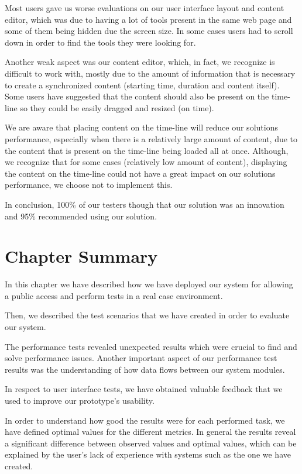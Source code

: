 Most users gave us worse evaluations on our user interface layout and content editor, which was due to having a lot of tools present in the same web page and some of them being hidden due the screen size. In some cases users had to scroll down in order to find the tools they were looking for. 

Another weak aspect was our content editor, which, in fact, we recognize is difficult to work with, mostly due to the amount of information that is necessary to create a synchronized content (starting time, duration and content itself). Some users have suggested that the content should also be present on the time-line so they could be easily dragged and resized (on time).

We are aware that placing content on the time-line will reduce our solutions performance, especially when there is a relatively large amount of content, due to the content that is present on the time-line being loaded all at once. Although, we recognize that for some cases (relatively low amount of content), displaying the content on the time-line could not have a great impact on our solutions performance, we choose not to implement this.

In conclusion, 100\% of our testers though that our solution was an innovation and 95\% recommended using our solution.


\section{Chapter Summary}
\label{evaluation:summary}

In this chapter we have described how we have deployed our system for allowing a public access and perform tests in a real case environment.
 
Then, we described the test scenarios that we have created in order to evaluate our system. 

The performance tests revealed unexpected results which were crucial to find and solve performance issues. Another important aspect of our performance test results was the understanding of how data flows between our system modules.

In respect to user interface tests, we have obtained valuable feedback that we used to improve our prototype's usability. 

In order to understand how good the results were for each performed task, we have defined optimal values for the different metrics. In general the results reveal a significant difference between observed values and optimal values, which can be explained by the user's lack of experience with systems such as the one we have created.